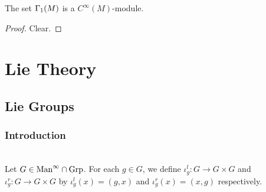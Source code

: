 \documentclass{book}
\begin{document}
\begin{ex}
	The set $\Gamma_1(M)$ is a $C^{\infty}(M)$-module.
\end{ex}

\begin{proof}
	Clear.
\end{proof}






























































\newpage

\part{Lie Theory}

\chapter{Lie Groups}

\section{Introduction}

\begin{defn}  \\
	Let $G \in \text{Man}^{\infty} \cap \text{Grp}$. For each $g \in G$, we define $\iota^l_g:G \rightarrow G \times G$ and $\iota^r_g:G \rightarrow G \times G$ by $\iota^l_g(x) = (g, x)$ and $\iota^r_g(x) = (x, g)$ respectively. 
\end{defn}
\end{document}

